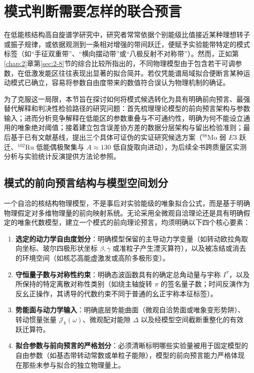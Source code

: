 \section{模式判断需要怎样的联合预言}\label{sec:3-8}

在低能核结构高自旋谱学研究中，研究者常常依据个别能级比值接近某种理想转子或振子规律，或依据观测到一条相对增强的带间跃迁，便赋予实验能带特定的模式标签（如“手征双重带”、“横向摆动带”或“八极反射不对称带”）。然而，正如第\ref{chap:2}章第\ref{sec:2-8}节的综合比较所指出的，不同物理模型由于包含若干可调参数，在低激发能区往往表现出显著的拟合简并。若仅凭能谱局域拟合便断言某种运动模式已确立，容易将参数自由度带来的数值符合误认为物理机制的确证。

为了克服这一局限，本节旨在探讨如何将模式候选转化为具有明确前向预言、最强替代解释和判决性检验路径的研究问题：首先梳理理论模型的前向预言架构与参数输入；进而分析竞争解释在低能区的参数重叠与不可通约性，明确为何不能设立通用的唯象绝对阈值；接着建立包含误差协方差的数据分层架构与留出检验准则；最后基于已有文献基线，提出三个具体可证伪的实证研究候选方案（$^{98}\mathrm{Mo}$ 弱 $E3$ 跃迁、$^{102}\mathrm{Ru}$ 低能偶极聚集与 $A \approx 130$ 低自旋取向进动），为后续全书跨质量区实测分析与实验统计反演提供方法论参照。\cite{lawrie_2020_Tiltedprecession,frauendorf_2014_Transversewobbling,nomura_2022_Questioningwobbling,lv_2022_Evidencewobbling,karmakar_2025_98mo_octupole,saracino_2026_102ru_dipole}

\subsection{模式的前向预言结构与模型空间划分}\label{sec:3-8-1}

一个自洽的核结构物理模型，不是事后对实验能级的唯象拟合公式，而是基于明确物理假定对多维物理量的前向映射系统。无论采用全微观自洽理论还是具有明确假定的唯象代数模型，建立一个模式的前向理论预言，均须明确以下四个核心要素：
\begin{enumerate}
\item \textbf{选定的动力学自由度划分}：明确模型保留的主导动力学变量（如转动欧拉角取向坐标、玻尔四极形状坐标 $\beta, \gamma$ 或准粒子产生湮灭算符），以及被冻结或消去的环境空间（如核芯高能虚激发或高阶多极形变）。
\item \textbf{守恒量子数与对称性约束}：明确态波函数具有的确定总角动量与宇称 $I^\pi$，以及所保持的特定离散对称性类别（如绕主轴旋转 $\pi$ 的签名量子数；时间反演作为反幺正操作，其诱导的代数约束不同于普通的幺正宇称本征标签）。
\item \textbf{势能面与动力学输入}：明确底层势能曲面（微观自洽势面或唯象变形势阱）、转动惯量张量 $\mathcal{J}_k(\omega)$、微观配对能隙 $\Delta$ 以及经模型空间截断重整化的有效跃迁算符。
\item \textbf{拟合参数与前向预言的严格划分}：必须清晰标明哪些实验量被用于固定模型的自由参数（如基态带转动常数或单粒子能隙），模型的前向预言能力严格体现在那些未参与拟合的独立物理量上。
\end{enumerate}


